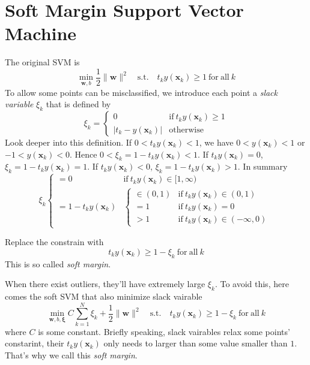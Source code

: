 \documentclass[../main.tex]{subfiles}
\begin{document}
    \section{Soft Margin Support Vector Machine}
        The original SVM is
        \[
            \min_{\mathbf{w},b} \frac{1}{2} \|\mathbf{w}\|^2 \mathrm{\quad s.t. \quad} t_k y(\mathbf{x}_k) \geq 1 \mathrm{~for~all~}k
        \]
        To allow some points can be misclassified, we introduce each point a \textit{slack variable} $\xi_k$ that is defined by
        \[
            \xi_k = \left\{
                        \begin{array}{rl}
                            0 & \mathrm{if ~} t_k y(\mathbf{x}_k) \geq 1 \\
                            |t_k - y(\mathbf{x}_k)| & \mathrm{otherwise}
                        \end{array}
                    \right.    
        \]
        Look deeper into this definition. If $0 < t_k y(\mathbf{x}_k) < 1$, we have $0 < y(\mathbf{x}_k) < 1$ or $-1 < y(\mathbf{x}_k) < 0$. Hence
        $0 < \xi_k = 1 - t_k y(\mathbf{x}_k) < 1$. If $t_k y(\mathbf{x}_k) = 0$, $\xi_k = 1 - t_k y(\mathbf{x}_k) = 1$. If $t_k y(\mathbf{x}_k) < 0$, $\xi_k = 1 - t_k y(\mathbf{x}_k) > 1$. In summary
        \[
            \xi_k \left\{
                        \begin{array}{ll}
                            = 0 & \mathrm{if ~} t_k y(\mathbf{x}_k) \in [1,\infty) \\
                            = 1 - t_k y(\mathbf{x}_k) & 
                            \left\{
                                \begin{array}{ll}
                                    \in (0, 1) & \mathrm{if ~} t_k y(\mathbf{x}_k) \in (0, 1)\\
                                    = 1 & \mathrm{if ~} t_k y(\mathbf{x}_k) = 0\\
                                    > 1 & \mathrm{if ~} t_k y(\mathbf{x}_k) \in (-\infty, 0)
                                \end{array}
                            \right.
                        \end{array}
                    \right.
        \]
        
        Replace the constrain with
        \[
            t_k y(\mathbf{x}_k) \geq 1 - \xi_k \mathrm{~for~all~}k
        \]
        This is so called \textit{soft margin}.

        When there exist outliers, they'll have extremely large $\xi_k$. To avoid this, here comes the soft SVM that also minimize slack vairable
        \[
            \min_{\mathbf{w},b, \mathbf{\xi}} C \sum_{k=1}^N \xi_k + \frac{1}{2} \|\mathbf{w}\|^2 \mathrm{\quad s.t. \quad} t_k y(\mathbf{x}_k) \geq 1 - \xi_k \mathrm{~for~all~}k
        \]
        where $C$ is some constant. Briefly speaking, slack vairables relax some points' constarint, their $t_k y(\mathbf{x}_k)$ only needs to larger than some value smaller than $1$. That's why we call this \textit{soft margin}.
\end{document}
